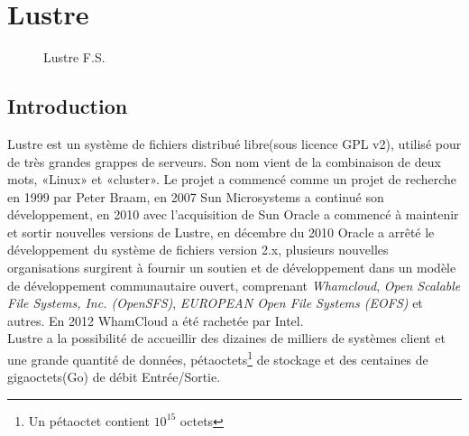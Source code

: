 \documentclass[12pt]{article}
\begin{document}
\section{Lustre}
\begin{figure}[H] 
\caption{Lustre F.S.}
\label{fig:speciation}
\end{figure}

\subsection{Introduction}
Lustre est un système de fichiers distribué libre(sous licence GPL v2), utilisé pour de très grandes grappes de serveurs. Son nom vient de la combinaison de deux mots, «Linux» et «cluster». Le projet a commencé comme un projet de recherche en 1999 par Peter Braam, en 2007 Sun Microsystems a continué son développement, en 2010 avec l'acquisition de Sun Oracle a commencé à maintenir et sortir nouvelles versions de Lustre, en décembre du 2010 Oracle a arrêté le développement du système de fichiers version 2.x, plusieurs nouvelles organisations surgirent à fournir un soutien et de développement dans un modèle de développement communautaire ouvert, comprenant \textit{Whamcloud}, \textit{Open Scalable File Systems, Inc. (OpenSFS)}, \textit{EUROPEAN Open File Systems (EOFS)} et autres. En 2012 WhamCloud a été rachetée par Intel.\\


Lustre a la possibilité de accueillir des dizaines de milliers de systèmes client et une grande quantité de données, pétaoctets\footnote{Un pétaoctet contient \begin{math}10^{15}\end{math} octets} de stockage et des centaines de gigaoctets(Go) de débit Entrée/Sortie. 
\end{document}
